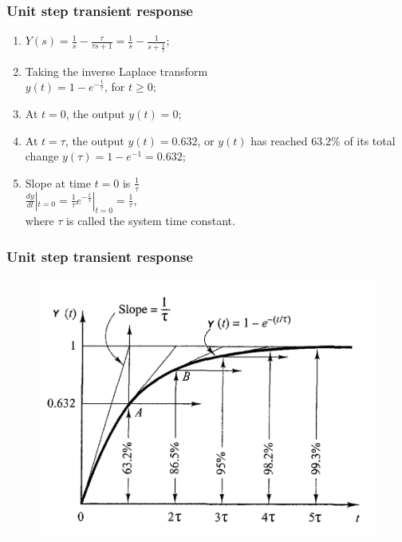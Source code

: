\begin{frame}
\frametitle{Unit step transient response}
	\begin{enumerate}
	\item$Y(s)= \frac{1}{s} - \frac{\tau}{\tau s +1} = 	\frac{1}{s} - \frac{1}{s+\frac{1}{\tau}}$;
	\item Taking the inverse Laplace transform
	\\ $y(t) = 1 - e^{-\frac{t}{\tau}}$, for $t\ge 0$;
	\item At $t=0$, the output $y(t)=0$;
	\item At $t=\tau$, the output $y(t)=0.632$, or $y(t)$ has reached $63.2\% $ of its total change $y(\tau)= 1 - e^{-1} = 0.632$;
	\item Slope at time $t=0$ is $\frac{1}{\tau}$
	\\ $\frac{dy}{dt}|_{t=0} = \frac{1}{\tau}e^{-\frac{t}{\tau}}|_{t=0} = \frac{1}{\tau}$,
	\\ where $\tau$ is called the system time constant.
\end{enumerate}
\end{frame}

\begin{frame}
\frametitle{Unit step transient response}
\vspace{-0.5em}
\begin{center}
	\begin{figure}
		\includegraphics[width=0.75\linewidth]{Afbeelding2}
	\end{figure}
\end{center}

\end{frame}

